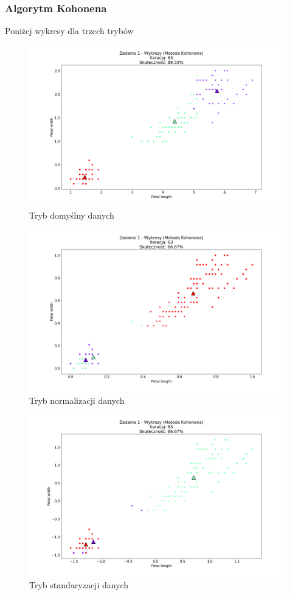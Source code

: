 \documentclass{classrep}
\begin{document}
{{		\subsubsection{Algorytm Kohonena}
		{ 
			Poniżej wykresy dla trzech trybów
				\begin{figure}[!htbp]
					\centering
					\includegraphics[width=\textwidth,width=95mm]{wykresy/plot_kohonenIrisDefault.png}
					\caption{Tryb domyślny danych}
				\end{figure}
			
				\begin{figure}[!htbp]
					\centering
					\includegraphics[width=\textwidth,width=95mm]{wykresy/plot_kohonenIrisNormalized.png}
					\caption{Tryb normalizacji danych}
				\end{figure}
		
				\begin{figure}[!htbp]
					\centering
					\includegraphics[width=\textwidth,width=95mm]{wykresy/plot_kohonenIrisStandardised.png}
					\caption{Tryb standaryzacji danych}
				\end{figure}
			\FloatBarrier		
		}

}}
\end{document}
